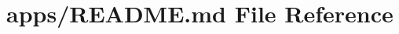 \hypertarget{apps_2_r_e_a_d_m_e_8md}{}\section{apps/\+R\+E\+A\+D\+ME.md File Reference}
\label{apps_2_r_e_a_d_m_e_8md}
